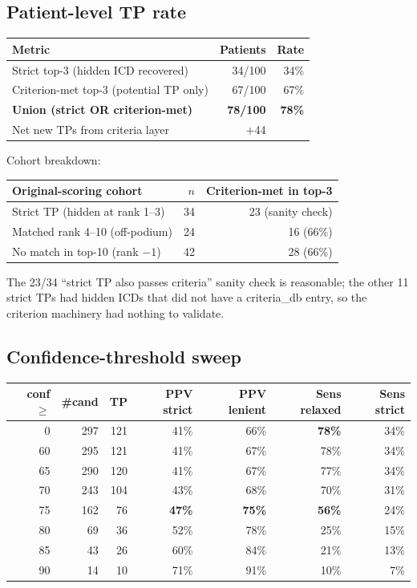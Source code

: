 \documentclass[11pt]{article}
\begin{document}
\subsection{Patient-level TP rate}
\begin{center}
\begin{tabular}{lrr}
\toprule
Metric & Patients & Rate \\
\midrule
Strict top-3 (hidden ICD recovered) & 34/100 & 34\% \\
Criterion-met top-3 (potential TP only) & 67/100 & 67\% \\
\textbf{Union (strict OR criterion-met)} & \textbf{78/100} & \textbf{78\%} \\
Net new TPs from criteria layer & +44 & \\
\bottomrule
\end{tabular}
\end{center}

Cohort breakdown:
\begin{center}
\begin{tabular}{lrr}
\toprule
Original-scoring cohort & $n$ & Criterion-met in top-3 \\
\midrule
Strict TP (hidden at rank 1--3) & 34 & 23 (sanity check) \\
Matched rank 4--10 (off-podium) & 24 & 16 (66\%) \\
No match in top-10 (rank $-1$) & 42 & 28 (66\%) \\
\bottomrule
\end{tabular}
\end{center}

The 23/34 ``strict TP also passes criteria'' sanity check is reasonable; the other 11
strict TPs had hidden ICDs that did not have a criteria\_db entry, so the criterion
machinery had nothing to validate.

\subsection{Confidence-threshold sweep}
\begin{center}
\small
\begin{tabular}{rrrrrrr}
\toprule
conf $\geq$ & \#cand & TP & PPV strict & PPV lenient & Sens relaxed & Sens strict \\
\midrule
0   & 297 & 121 & 41\% & 66\% & \textbf{78\%} & 34\% \\
60  & 295 & 121 & 41\% & 67\% & 78\% & 34\% \\
65  & 290 & 120 & 41\% & 67\% & 77\% & 34\% \\
70  & 243 & 104 & 43\% & 68\% & 70\% & 31\% \\
75  & 162 &  76 & \textbf{47\%} & \textbf{75\%} & \textbf{56\%} & 24\% \\
80  &  69 &  36 & 52\% & 78\% & 25\% & 15\% \\
85  &  43 &  26 & 60\% & 84\% & 21\% & 13\% \\
90  &  14 &  10 & 71\% & 91\% & 10\% &  7\% \\
\bottomrule
\end{tabular}
\end{center}
\end{document}

